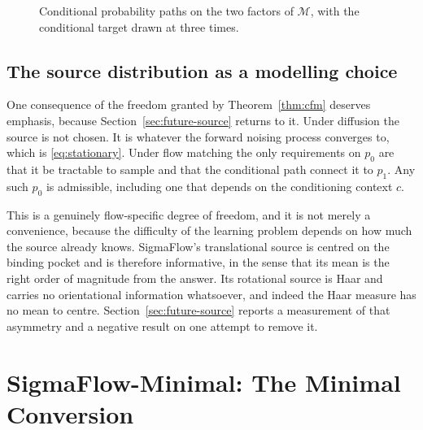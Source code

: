 \documentclass[11pt,a4paper]{report}
\theoremstyle{plain}
\theoremstyle{definition}
\theoremstyle{remark}
\newif\ifdraftmode
\newcommand{\figplaceholder}[3]{%
  \begin{figure}[htbp]
  \centering
  \ifdraftmode
    \begin{tcolorbox}[
      width=0.92\textwidth, colback=PanelGrey, colframe=DraftGrey,
      boxrule=0.5pt, sharp corners, halign=flush left]
      \small\sffamily
      \textbf{\color{DraftBlue}FIGURE PLACEHOLDER}\\[3pt]
      #3
    \end{tcolorbox}
  \else
    \fbox{\parbox{0.9\textwidth}{\centering\vspace{2cm}[figure]\vspace{2cm}}}
  \fi
  \caption{#2}
  \label{#1}
  \end{figure}}
\newcommand{\R}{\mathbb{R}}
\newcommand{\SOthree}{\mathrm{SO}(3)}
\newcommand{\Mfd}{\mathcal{M}}
\newcommand{\ctx}{c}
\newcommand{\Rot}{R}
\begin{document}
\figplaceholder{fig:paths}
{Conditional probability paths on the two factors of $\Mfd$, with the
conditional target drawn at three times.}
{Two panels.
\textbf{Left:} $\R^3$ drawn as $\R^2$. A source sample $x_0$ from a Gaussian
centred at the pocket origin, the data point $x_1$, the straight interpolant,
and the constant target $x_1-x_0$ drawn as equal arrows at
$t = 0.2, 0.5, 0.8$.
\textbf{Right:} $\SOthree$ drawn as a schematic curved surface. $\Rot_0$
sampled Haar-uniformly, $\Rot_1$ the crystal orientation, the geodesic between
them, and the body-frame target drawn at the same three times, with identical
length at every $t$. The visual point is that neither set of arrows shrinks as
$t \to 1$, which is what distinguishes the endpoint parameterisation from the
state-dependent one. Replaces roughly $250$ words.}

\section{The source distribution as a modelling choice}
\label{sec:source-theory}

One consequence of the freedom granted by Theorem~\ref{thm:cfm} deserves
emphasis, because Section~\ref{sec:future-source} returns to it. Under
diffusion the source is not chosen. It is whatever the forward noising process
converges to, which is \eqref{eq:stationary}. Under flow matching the only
requirements on $p_0$ are that it be tractable to sample and that the
conditional path connect it to $p_1$. Any such $p_0$ is admissible, including
one that depends on the conditioning context $\ctx$.

This is a genuinely flow-specific degree of freedom, and it is not merely a
convenience, because the difficulty of the learning problem depends on how much
the source already knows. SigmaFlow's translational source is centred on the
binding pocket and is therefore informative, in the sense that its mean is the
right order of magnitude from the answer. Its rotational source is Haar and
carries no orientational information whatsoever, and indeed the Haar measure
has no mean to centre. Section~\ref{sec:future-source} reports a measurement of
that asymmetry and a negative result on one attempt to remove it.

\chapter{SigmaFlow-Minimal: The Minimal Conversion}
\label{ch:minimal}
\end{document}
